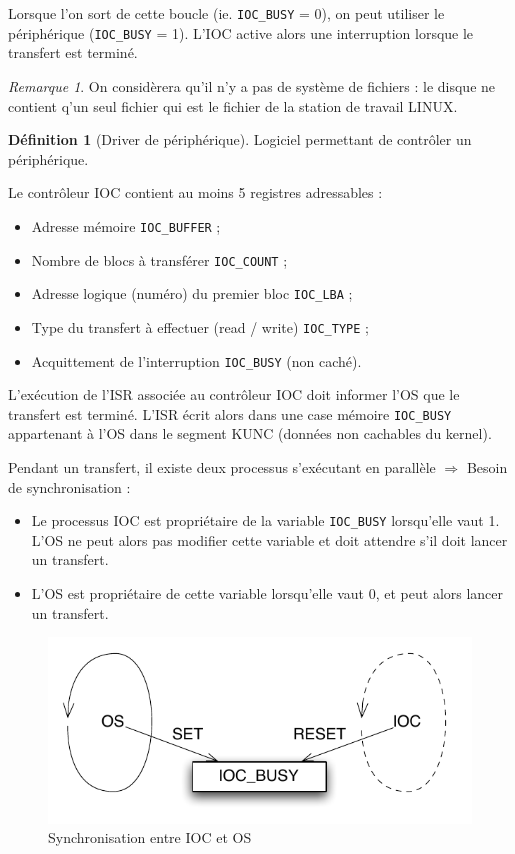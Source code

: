 \documentclass[11pt,english,french]{scrreprt}
\theoremstyle{remark}
\newtheorem*{rem*}{Remarque}
\theoremstyle{definition}
\newtheorem*{def*}{Définition}
\begin{document}
Lorsque l'on sort de cette boucle (ie. \lstinline!IOC_BUSY! = 0), on peut utiliser le périphérique (\lstinline!IOC_BUSY! = 1). L'IOC active alors une interruption lorsque le transfert est terminé. 

\begin{rem*}
	On considèrera qu'il n'y a pas de système de fichiers : le disque ne contient q'un seul fichier qui est le fichier de la station de travail LINUX.
\end{rem*}

\begin{def*}[Driver de périphérique]
	Logiciel permettant de contrôler un périphérique.
\end{def*}

Le contrôleur IOC contient au moins 5 registres adressables :\begin{itemize}
	\item Adresse mémoire \lstinline!IOC_BUFFER! ;
	\item Nombre de blocs à transférer \lstinline!IOC_COUNT! ;
	\item Adresse logique (numéro) du premier bloc \lstinline!IOC_LBA! ;
	\item Type du transfert à effectuer (read / write) \lstinline!IOC_TYPE! ;
	\item Acquittement de l'interruption \lstinline!IOC_BUSY! (non caché).
\end{itemize}

L'exécution de l'ISR associée au contrôleur IOC doit informer l'OS que le transfert est terminé. L'ISR écrit alors dans une case mémoire \lstinline!IOC_BUSY! appartenant à l'OS dans le segment KUNC (données non cachables du kernel).

Pendant un transfert, il existe deux processus s'exécutant en parallèle $\Rightarrow$ Besoin de synchronisation :\begin{itemize}
	\item Le processus IOC est propriétaire de la variable \lstinline!IOC_BUSY! lorsqu'elle vaut 1. L'OS ne peut alors pas modifier cette variable et doit attendre s'il doit lancer un transfert.
	\item L'OS est propriétaire de cette variable lorsqu'elle vaut 0, et peut alors lancer un transfert.
\end{itemize}

\begin{figure}[!h]
	\center
	\includegraphics[scale=.75]{diagrammes/IOC-OS}
	\caption{Synchronisation entre IOC et OS}
\end{figure}
\end{document}
